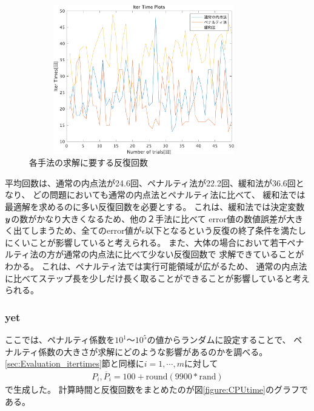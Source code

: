 \documentclass[11pt,a4paper,dvipdfmx,titlepage,uplatex]{jsarticle}
\theoremstyle{mystyle}
\newcommand{\red}[1]{\begin{color}{red}#1\end{color}}
\newcommand{\0}{\mathbf{0}}
\def\y{\mbox{\boldmath $y$}}
\begin{document}
\begin{figure}[h]
  \begin{center}
    \includegraphics[width=100mm,height=65mm]{IterTimePlots2_1.pdf}
    \caption{各手法の求解に要する反復回数 \label{figure:hanpukukaisu}}
  \end{center}
\end{figure}

平均回数は、通常の内点法が24.6回、ペナルティ法が22.2回、緩和法が36.6回となり、
どの問題においても通常の内点法とペナルティ法に比べて、
緩和法では最適解を求めるのに多い反復回数を必要とする。
これは、緩和法では決定変数$\y$の数がかなり大きくなるため、他の２手法に比べて
error値の数値誤差が大きく出てしまうため、全てのerror値が$\epsilon$以下となるという反復の終了条件を満たしにくいことが影響していると考えられる。
また、大体の場合において若干ペナルティ法の方が通常の内点法に比べて少ない反復回数で
求解できていることがわかる。
これは、ペナルティ法では実行可能領域が広がるため、
通常の内点法に比べてステップ長を少しだけ長く取ることができることが影響していると考えられる。

\subsubsection{yet}\label{sec:Evaluation_penalty_coefficient}

ここでは、ペナルティ係数を$10^1$〜$10^5$の値からランダムに設定することで、
ペナルティ係数の大きさが求解にどのような影響があるのかを調べる。
\ref{sec:Evaluation_itertimes}節と同様に$i = 1 , \cdots , m$に対して
\begin{align}
  P_i,\overline{P}_i = 100 + \text{round}(9900*\text{rand})
\end{align}
で生成した。
計算時間と反復回数をまとめたのが図\ref{figure:CPUtime}のグラフである。
\end{document}
